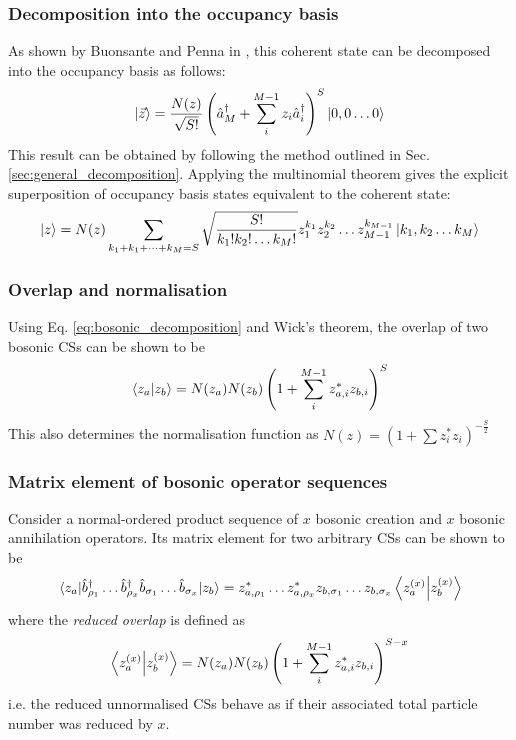 \subsubsection{Decomposition into the occupancy basis}
As shown by Buonsante and Penna in \cite{buonsante}, this coherent state can be decomposed into the occupancy basis as follows:
\begin{equation} \label{eq:bosonic_decomposition}
\ket{\vec{z}}=\frac{N(z)}{\sqrt{S!}}\left(\hat{a}^\dagger_M+\sum_i^{M-1}z_i\hat{a}^\dagger_i\right)^S\ket{0,0\dots 0}
\end{equation}
This result can be obtained by following the method outlined in Sec. \ref{sec:general_decomposition}. Applying the multinomial theorem gives the explicit superposition of occupancy basis states equivalent to the coherent state:
\begin{equation}
\ket{z}=N(z)\sum_{k_1+k_1+\dots +k_M=S}\sqrt{\frac{S!}{k_1!k_2!\dots k_M!}}z_1^{k_1}z_2^{k_2}\dots z_{M-1}^{k_{M-1}}\ket{k_1,k_2\dots k_M}
\end{equation}

\subsubsection{Overlap and normalisation}
Using Eq. \ref{eq:bosonic_decomposition} and Wick's theorem, the overlap of two bosonic CSs can be shown \cite{grossmann} to be
\begin{equation} \label{eq:bosonic_overlap}
\braket{z_a}{z_b}=N(z_a)N(z_b)\left(1+\sum_i^{M-1}z_{a,i}^*z_{b,i}\right)^S
\end{equation}
This also determines the normalisation function as
$N(z)=\left(1+\sum z_i^*z_i\right)^{-\frac{S}{2}}$


\subsubsection{Matrix element of bosonic operator sequences}
Consider a normal-ordered product sequence of $x$ bosonic creation and $x$ bosonic annihilation operators. Its matrix element for two arbitrary CSs can be shown \cite{grossmann} to be
\begin{equation} \label{eq:bosonic_OSME}
\mel{z_a}{\hat{b}^\dagger_{\rho_1}\dots\hat{b}^\dagger_{\rho_x}\hat{b}_{\sigma_1}\dots\hat{b}_{\sigma_x}}{z_b}=z_{a,\rho_1}^*\dots z_{a,\rho_x}^*z_{b,\sigma_1}\dots z_{b,\sigma_x} \braket{z_a^{(x)}}{z_b^{(x)}}
\end{equation}
where the \textit{reduced overlap} is defined as
\begin{equation}
\braket{z_a^{(x)}}{z_b^{(x)}}=N(z_a)N(z_b)\left(1+\sum_i^{M-1}z_{a,i}^*z_{b,i}\right)^{S-x}
\end{equation}
i.e. the reduced unnormalised CSs behave as if their associated total particle number was reduced by $x$.

